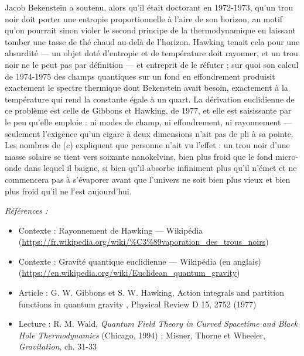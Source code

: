 \documentclass[11pt]{article}
\newenvironment{refs}{\par\small\noindent\emph{Références :}\begin{itemize}\setlength\itemsep{0pt}}{\end{itemize}\normalsize}
\begin{document}
\noindent Jacob Bekenstein a soutenu, alors qu'il était doctorant en 1972-1973, qu'un
trou noir doit porter une entropie proportionnelle à l'aire de son horizon, au motif qu'on
pourrait sinon violer le second principe de la thermodynamique en laissant tomber une tasse de thé
chaud au-delà de l'horizon. Hawking tenait cela pour une absurdité --- un objet doté d'entropie et
de température doit rayonner, et un trou noir ne le peut pas par définition --- et entreprit de le
réfuter ; sur quoi son calcul de 1974-1975 des champs quantiques sur un fond en effondrement
produisit exactement le spectre thermique dont Bekenstein avait besoin, exactement à la
température qui rend la constante égale à un quart. La dérivation euclidienne de ce problème est
celle de Gibbons et Hawking, de 1977, et elle est saisissante par le peu qu'elle emploie : ni
modes de champ, ni effondrement, ni rayonnement --- seulement l'exigence qu'un cigare à deux
dimensions n'ait pas de pli à sa pointe. Les nombres de (c) expliquent que personne n'ait vu
l'effet : un trou noir d'une masse solaire se tient vers soixante nanokelvins, bien plus froid que
le fond micro-onde dans lequel il baigne, si bien qu'il absorbe infiniment plus qu'il n'émet et ne
commencera pas à s'évaporer avant que l'univers ne soit bien plus vieux et bien plus froid qu'il
ne l'est aujourd'hui.

\begin{refs}
\item Contexte : Rayonnement de Hawking --- Wikipédia (\url{https://fr.wikipedia.org/wiki/%C3%89vaporation_des_trous_noirs})
\item Contexte : Gravité quantique euclidienne --- Wikipédia (en anglais) (\url{https://en.wikipedia.org/wiki/Euclidean_quantum_gravity})
\item Article : G. W. Gibbons et S. W. Hawking, \og{} Action integrals and partition functions in quantum gravity \fg{}, Physical Review D 15, 2752 (1977)
\item Lecture : R. M. Wald, \textit{Quantum Field Theory in Curved Spacetime and Black Hole Thermodynamics} (Chicago, 1994) ; Misner, Thorne et Wheeler, \textit{Gravitation}, ch. 31-33
\end{refs}

\bigskip
\end{document}
